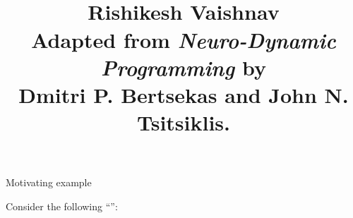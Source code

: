\documentclass{rl_theory/rl_theory}
\def\sc{\setcounter}
\def\nc{\newcounter}
\def\hlg#1{\hlc[lightlightlightgray]{#1}}
\begin{document}
\title{
\\
\vspace{10pt}
\large 
Rishikesh Vaishnav\\ 
\vspace{10pt}
\normalsize 
Adapted from
{\it Neuro-Dynamic Programming}
by \\
Dmitri P. Bertsekas
and
John N. Tsitsiklis.
}
\maketitle

\begin{part} {Motivating example}
  \def\agent{\draw (center) node [rectangle, draw=black, fill=blue, inner sep=0.14cm] {};}

  \def\ifbool{\xintifboolexpr}

  \def\tilecoords#1#2{\draw ($(#1 * \tilesep,#2 * \tilesep)$) node (center) {};}
  \def\tile#1{\draw (center) node (#1) [rectangle, draw=black, inner sep=1cm] {};}
  \def\tileidx#1{\draw ($(center) - (0.5, 0.5)$) node [rectangle, draw=black, minimum size=0.4cm] {{#1}};}

  \def\tileandidx#1{\tile{#1}\tileidx{#1}}

  \def\tilecenter#1#2{\draw (#1, #2) node (center) {};}
  \def\tiledir#1#2{\draw [->, #1] (center) -- +#2;}
  \def\tileup#1{\tiledir{#1}{(0, -0.5)}}
  \def\tiledown#1{\tiledir{#1}{(0, 0.5)}}
  \def\tileright#1{\tiledir{#1}{(0.5, 0)}}
  \def\tileleft#1{\tiledir{#1}{(-0.5, 0)}}

  \def\tiletransition#1#2#3#4{\draw [->, opacity=#4] (#1) -- node [#3] {#4} (#2);}

  \def\tilesep{2}

  \def\actions#1#2{
    \ifbool {#1 > 0} { \tileup{} }{}
    \ifbool {#1 < 2} { \tiledown{} }{}
    \ifbool {#2 < 2} { \tileright{} }{}
    \ifbool {#2 > 0} { \tileleft{} }{}
  }

  \def\brd{\hlg{environment}}
  \def\agt{\hlg{agent}}
  \def\til{\hlg{state}}
  \def\act{\hlg{action}}
  \def\stp{\hlg{step}}
  \def\trd{\hlg{transition distribution}}
  \def\ind{\hlg{initial distribution}}
  \def\rwd{\hlg{return}}
  \def\tileloop#1{
    \foreach \row in {0,1,...,2}
    {\sc{row}{\row}
      \foreach \col in {0,1,...,2}
      {\sc{col}{\col}
        \setidx
        #1
      }
    }
  }
  Consider the following ``\brd'':\\
  \def\boardopts{}
  \begin{center}
\end{center}
\end{part}
\end{document}

